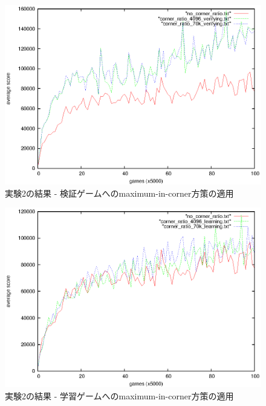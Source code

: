 \documentclass{suribt}
\begin{document}
\begin{figure}[tb]
	\begin{center}
	\includegraphics[width=13cm]{figure_007.eps}
	\caption{実験2の結果 - 検証ゲームへのmaximum-in-corner方策の適用}
	\label{figure_007}
	\end{center}
\end{figure}

\begin{figure}[tb]
	\begin{center}
	\includegraphics[width=13cm]{figure_008.eps}
	\caption{実験2の結果 - 学習ゲームへのmaximum-in-corner方策の適用}
	\label{figure_008}
	\end{center}
\end{figure}
\end{document}

